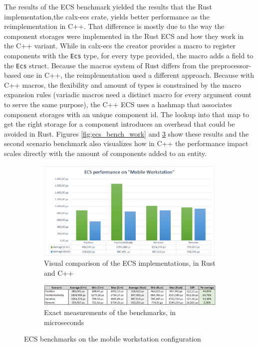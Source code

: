 The results of the \ac{ECS} benchmark yielded the results that the Rust implementation,the calx-ecs crate, yields better performance as the reimplementation in C++. That difference is mostly due to the way the component storages were implemented in the Rust \ac{ECS} and how they work in the C++ variant. While in calx-ecs the creator provides a macro to register components with the \texttt{Ecs} type, for every type provided, the macro adds a field to the \texttt{Ecs} struct. Because the macros system of Rust differs from the preprocessor-based one in C++, the reimplementation used a different approach. Because with C++ macros, the flexibility and amount of types is constrained by the macro expansion rules (variadic macros need a distinct macro for every argument count to serve the same purpose), the C++ \ac{ECS} uses a hashmap that associates component storages with an unique component id. The lookup into that map to get the right storage for a component introduces an overhead that could be avoided in Rust. Figures \ref{fig;ecs_bench_work} and \ref{fig:ecs_bench_blade} show these results and the second scenario benchmark also visualizes how in C++ the performance impact scales directly with the amount of components added to an entity. 

\begin{figure}[h!]
	\centering
	\begin{subfigure}[b]{\textwidth}
		\includegraphics[width=1\linewidth]{PICs/ecs_bench_workstation.png}
		\caption{Visual comparison of the \ac{ECS} implementations, in Rust and C++}
		\label{fig:ecs_bench_work} 
	\end{subfigure}
	
	\begin{subfigure}[b]{\textwidth}
		\includegraphics[width=1\linewidth]{PICs/ecs_bench_workstation_data.png}
		\caption{Exact measurements of the benchmarks, in microseconds}
		\label{fig:ecs_bench_blade}
	\end{subfigure}
	
	\caption[ECS benchmarks workstation]{\ac{ECS} benchmarks on the mobile workstation configuration}
\end{figure}

